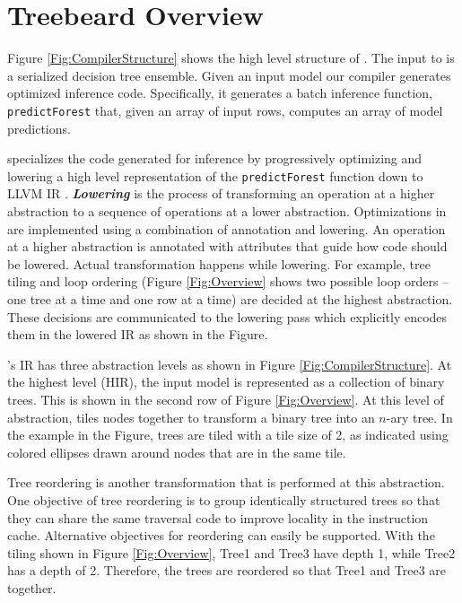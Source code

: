 \section{Treebeard Overview}
\label{Sec:Overview}
Figure \ref{Fig:CompilerStructure} shows the high level structure of \Treebeard{}. 
The input to \Treebeard{} is a serialized decision tree ensemble. 
Given an input model our compiler generates optimized inference code. Specifically, it generates a 
batch inference function, \texttt{predictForest} that, given an array of input rows, computes an
array of model predictions.
 
\Treebeard{} specializes the code generated for inference by progressively optimizing and lowering a 
high level representation of the \texttt{predictForest} function down to LLVM IR \cite{LLVM}.
\textbf{\emph{Lowering}} is the process of transforming an operation at a higher 
abstraction to a sequence of operations at a lower abstraction. Optimizations in \Treebeard{} 
are implemented using a combination of annotation and lowering. An operation at a higher 
abstraction is annotated with attributes that guide how code should be lowered. 
Actual transformation happens while lowering.
 For example, tree tiling and loop ordering (Figure \ref{Fig:Overview} 
shows two possible loop orders -- one tree at a time and one row at a time) are decided 
at the highest abstraction. These decisions are communicated to the lowering pass 
which explicitly encodes them in the lowered IR as shown in the Figure.

\Treebeard{}'s IR has three abstraction levels as shown in Figure \ref{Fig:CompilerStructure}.  
At the highest level (HIR), the input model is represented as a collection of binary trees. This is shown 
in the second row of Figure \ref{Fig:Overview}. At this level of abstraction,
\Treebeard{} tiles nodes together to transform a binary tree into an $n$-ary tree. 
In the example in the Figure, 
trees are tiled with a tile size of 2, as indicated using colored ellipses drawn 
around nodes that are in the same tile. 

Tree reordering is another transformation that is performed at this abstraction. 
One objective of tree reordering is to group identically structured trees so that they can share the same traversal code
to improve locality in the instruction cache.  Alternative objectives for reordering can easily be supported.
With the tiling shown in Figure \ref{Fig:Overview}, Tree1 and Tree3 have depth 1, while Tree2 has a depth of 2.
Therefore, the trees are reordered so that Tree1 and Tree3 are together. 

